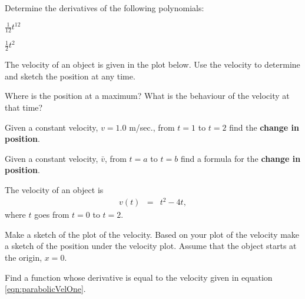 \begin{problem}
\item Determine the derivatives of the following polynomials:
  \begin{subproblem}
    \item $\frac{1}{12} t^{12}$
      \vfill
    \item $\frac{1}{2} t^{2}$
      \vfill
  \end{subproblem}

\item The velocity of an object is given in the plot below. Use the
  velocity to determine and sketch the position at any time.

  \scalebox{0.7}{}


  \begin{subproblem}
  \item Where is the position at a maximum? What is the behaviour of
    the velocity at that time? 
    \vspace{3em}
  \item Given a constant velocity, $v=1.0$ m/sec., from $t=1$ to $t=2$
    find the \textbf{change in position}.  
    \vfill
  \item Given a constant velocity, $\bar{v}$, from $t=a$ to $t=b$ find
    a formula for the \textbf{change in position}.
    \vfill
  \end{subproblem}

\item The velocity of an object is
  \begin{eqnarray}
    \label{eqn:parabolicVelOne}
    v(t) & = & t^2 - 4t,
  \end{eqnarray}
  where $t$ goes from $t=0$ to $t=2$.

  \begin{subproblem}
  \item Make a sketch of the plot of the velocity.  Based on your plot
    of the velocity make a sketch of the position under the velocity
    plot. Assume that the object starts at the origin, $x=0$.

    \vfill

  \item Find a function whose derivative is equal to the velocity
    given in equation \ref{eqn:parabolicVelOne}.


\end{subproblem}
\end{problem}
